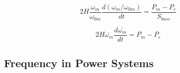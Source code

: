 \begin{equation}
2H\frac{\omega_{m}}{\omega_{0m}}\frac{d(\omega_{m}/\omega_{0m})}{dt}=\frac{P_{m}-P_{e}}{S_{base}}
\label{eqmotion4}
\end{equation}

\begin{equation}
2H\overline{\omega_{m}}\frac{d\overline{\omega_{m}}}{dt}=\overline{P_{m}}-\overline{P_{e}}
\label{eqmotion5}
\end{equation}

\subsection{Frequency in Power Systems}
